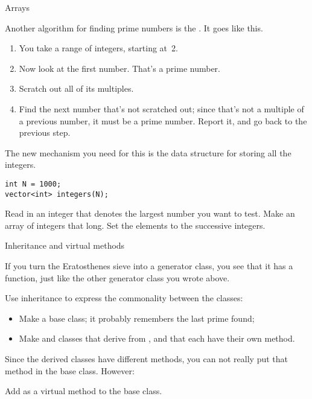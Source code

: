  {Arrays}

Another algorithm for finding prime numbers is the
. It goes like this.
\begin{enumerate}
\item You take a range of integers, starting at~2.
\item Now look at the first number. That's a prime number.
\item Scratch out all of its multiples.
\item Find the next number that's not scratched out; since that's
  not a multiple of a previous number, it must be a prime
  number. Report it, and go back to the previous step.
\end{enumerate}

The new mechanism you need for this is the data structure for storing
all the integers.
\begin{verbatim}
int N = 1000;
vector<int> integers(N);
\end{verbatim}

\begin{exercise}
  Read in an integer that denotes the largest number you want to test.
  Make an array of integers that long. Set the elements to the
  successive integers.
\end{exercise}

 {Inheritance and virtual methods}

If you turn the Eratosthenes sieve into a generator class, you see
that it has a  function, just like the other generator
class you wrote above.

\begin{exercise}
  Use inheritance to express the commonality between the classes:
  \begin{itemize}
  \item Make a  base class; it probably remembers the
    last prime found;
  \item Make  and  classes
    that derive from , and that each have their own
     method.
  \end{itemize}
\end{exercise}

Since the derived classes have different  methods, you
can not really put that method in the base class. However:

\begin{exercise}
  Add  as a virtual method to the base class.
\end{exercise}
